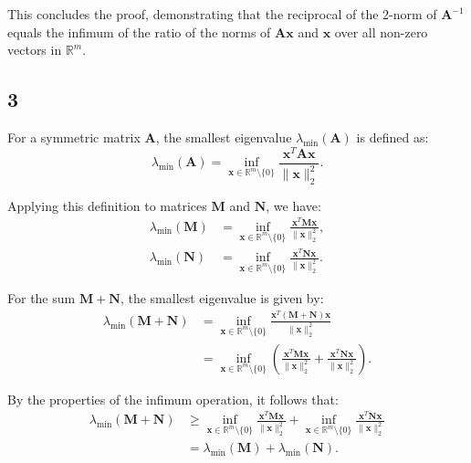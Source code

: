 \documentclass{article}
\begin{document}
This concludes the proof, demonstrating that the reciprocal of the 2-norm of $\boldsymbol{A}^{-1}$ equals the infimum of the ratio of the norms of $\boldsymbol{A} \boldsymbol{x}$ and $\boldsymbol{x}$ over all non-zero vectors in $\mathbb{R}^m$.
\subsection{3}
For a symmetric matrix $\boldsymbol{A}$, the smallest eigenvalue $\lambda_{\min }(\boldsymbol{A})$ is defined as:
$$
\lambda_{\min }(\boldsymbol{A}) = \inf_{\boldsymbol{x} \in \mathbb{R}^m \setminus \{0\}} \frac{\boldsymbol{x}^T \boldsymbol{A} \boldsymbol{x}}{\|\boldsymbol{x}\|_2^2}.
$$

Applying this definition to matrices $\boldsymbol{M}$ and $\boldsymbol{N}$, we have:
\begin{align*}
\lambda_{\min }(\boldsymbol{M}) &= \inf_{\boldsymbol{x} \in \mathbb{R}^m \setminus \{0\}} \frac{\boldsymbol{x}^T \boldsymbol{M} \boldsymbol{x}}{\|\boldsymbol{x}\|_2^2}, \\
\lambda_{\min }(\boldsymbol{N}) &= \inf_{\boldsymbol{x} \in \mathbb{R}^m \setminus \{0\}} \frac{\boldsymbol{x}^T \boldsymbol{N} \boldsymbol{x}}{\|\boldsymbol{x}\|_2^2}.
\end{align*}

For the sum $\boldsymbol{M} + \boldsymbol{N}$, the smallest eigenvalue is given by:
\begin{align*}
\lambda_{\min }(\boldsymbol{M} + \boldsymbol{N}) &= \inf_{\boldsymbol{x} \in \mathbb{R}^m \setminus \{0\}} \frac{\boldsymbol{x}^T(\boldsymbol{M} + \boldsymbol{N})\boldsymbol{x}}{\|\boldsymbol{x}\|_2^2} \\
&= \inf_{\boldsymbol{x} \in \mathbb{R}^m \setminus \{0\}} \left( \frac{\boldsymbol{x}^T \boldsymbol{M} \boldsymbol{x}}{\|\boldsymbol{x}\|_2^2} + \frac{\boldsymbol{x}^T \boldsymbol{N} \boldsymbol{x}}{\|\boldsymbol{x}\|_2^2} \right).
\end{align*}

By the properties of the infimum operation, it follows that:
\begin{align*}
\lambda_{\min }(\boldsymbol{M} + \boldsymbol{N}) &\geq \inf_{\boldsymbol{x} \in \mathbb{R}^m \setminus \{0\}} \frac{\boldsymbol{x}^T \boldsymbol{M} \boldsymbol{x}}{\|\boldsymbol{x}\|_2^2} + \inf_{\boldsymbol{x} \in \mathbb{R}^m \setminus \{0\}} \frac{\boldsymbol{x}^T \boldsymbol{N} \boldsymbol{x}}{\|\boldsymbol{x}\|_2^2} \\
&= \lambda_{\min }(\boldsymbol{M}) + \lambda_{\min }(\boldsymbol{N}).
\end{align*}
\end{document}
